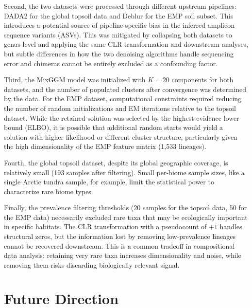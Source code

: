 \documentclass[12pt, oneside]{report}
\begin{document}
Second, the two datasets were processed through different upstream pipelines: DADA2 for
the global topsoil data and Deblur for the EMP soil subset. This introduces a potential
source of pipeline-specific bias in the inferred amplicon sequence variants (ASVs). This was
mitigated by collapsing both datasets to genus level and applying the same CLR
transformation and downstream analyses, but subtle differences in how the two denoising
algorithms handle sequencing error and chimeras cannot be entirely excluded as a
confounding factor.

Third, the MixGGM model was initialized with $K = 20$ components for both datasets, and
the number of populated clusters after convergence was determined by the data. For the EMP
dataset, computational constraints required reducing the number of random initializations
and EM iterations relative to the topsoil dataset. While the retained solution was selected
by the highest evidence lower bound (ELBO), it is possible that additional random starts
would yield a solution with higher likelihood or different cluster structure, particularly
given the high dimensionality of the EMP feature matrix (1,533 lineages).

Fourth, the global topsoil dataset, despite its global geographic coverage, is relatively
small (193 samples after filtering). Small per-biome sample sizes, like a single Arctic
tundra sample, for example, limit the statistical power to characterize rare biome types.

Finally, the prevalence filtering thresholds (20 samples for the topsoil data, 50 for the
EMP data) necessarily excluded rare taxa that may be ecologically important in specific
habitats. The CLR transformation with a pseudocount of $+1$ handles structural zeros, but
the information lost by removing low-prevalence lineages cannot be recovered downstream.
This is a common tradeoff in compositional data analysis: retaining very rare taxa increases
dimensionality and noise, while removing them risks discarding biologically relevant signal.

\section{Future Direction}
\label{disc:outlook}
\end{document}
